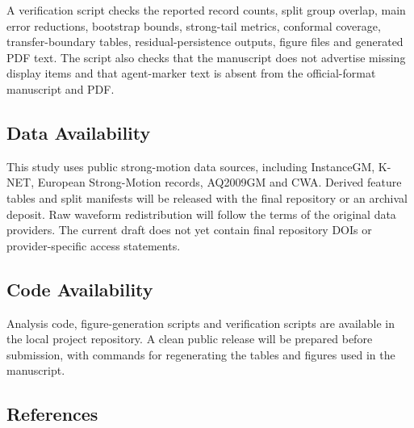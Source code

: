 \documentclass[
  10pt,
]{article}
\begin{document}
A verification script checks the reported record counts, split group
overlap, main error reductions, bootstrap bounds, strong-tail metrics,
conformal coverage, transfer-boundary tables, residual-persistence
outputs, figure files and generated PDF text. The script also checks
that the manuscript does not advertise missing display items and that
agent-marker text is absent from the official-format manuscript and PDF.

\subsection{Data Availability}\label{data-availability}

This study uses public strong-motion data sources, including InstanceGM,
K-NET, European Strong-Motion records, AQ2009GM and CWA. Derived feature
tables and split manifests will be released with the final repository or
an archival deposit. Raw waveform redistribution will follow the terms
of the original data providers. The current draft does not yet contain
final repository DOIs or provider-specific access statements.

\subsection{Code Availability}\label{code-availability}

Analysis code, figure-generation scripts and verification scripts are
available in the local project repository. A clean public release will
be prepared before submission, with commands for regenerating the tables
and figures used in the manuscript.

\subsection{References}\label{references}
\end{document}
